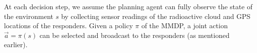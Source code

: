 At each decision step, we assume the planning agent can fully
observe the state of the environment $s$ by collecting sensor
readings of the radioactive cloud and GPS locations of the
responders. Given a policy $\pi$ of the MMDP, a joint action
$\vec{a}=\pi(s)$ can be selected and broadcast to the responders
(as mentioned earlier).
